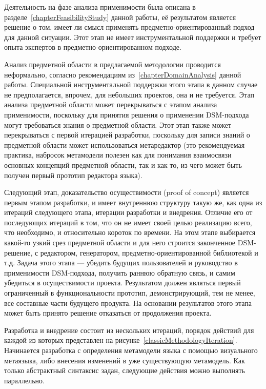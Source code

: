 Деятельность на фазе анализа применимости была описана в разделе~\ref{chapterFeasibilityStudy} 
данной работы, её результатом является решение о том, имеет ли смысл применять предметно-ориентированный 
подход для данной ситуации. Этот этап не имеет инструментальной поддержки и требует 
опыта экспертов в предметно-ориентированном подходе.

Анализ предметной области в предлагаемой методологии проводится неформально, согласно 
рекомендациям из~\ref{chapterDomainAnalysis} данной работы. Специальной инструментальной 
поддержки этого этапа в данном случае не предполагается, впрочем, для небольших проектов, 
она и не требуется. Этап анализа предметной области может перекрываться с этапом анализа 
применимости, поскольку для принятия решения о применении DSM-подхода могут требоваться 
знания о предметной области. Этот этап также может перекрываться с первой итерацией 
разработки, поскольку для записи знаний о предметной области может использоваться 
метаредактор (это рекомендуемая практика, набросок метамодели полезен как для понимания 
взаимосвязи основных концепций предметной области, так и как то, из чего может быть 
получен первый прототип редактора языка).

Следующий этап, доказательство осуществимости (proof of concept) является первым этапом 
разработки, и имеет внутреннюю структуру такую же, как одна из итераций следующего этапа, 
итерации разработки и внедрения. Отличие его от последующих итераций в том, что он не 
имеет своей целью реализацию всего, что необходимо, и относительно короток по времени. 
На этом этапе выбирается какой-то узкий срез предметной области и для него строится 
законченное DSM-решение, с редактором, генератором, предметно-ориентированной библиотекой 
и т.д. Задача этого этапа --- убедить будущих пользователей и руководство в применимости 
DSM-подхода, получить раннюю обратную связь, и самим убедиться в осуществимости проекта. 
Результатом должен являться первый ограниченный в функциональности прототип, демонстрирующий, 
тем не менее, все составные части будущего продукта. На основании результатов этого 
этапа может быть принято решение отказаться от продолжения проекта.

Разработка и внедрение состоит из нескольких итераций, порядок действий для каждой 
из которых представлен на рисунке~\ref{classicMethodologyIteration}. Начинается разработка 
с определения метамодели языка с помощью визуального метаязыка, либо внесения изменений 
в уже существующую метамодель. Как только абстрактный синтаксис задан, следующие действия 
можно выполнять параллельно.

